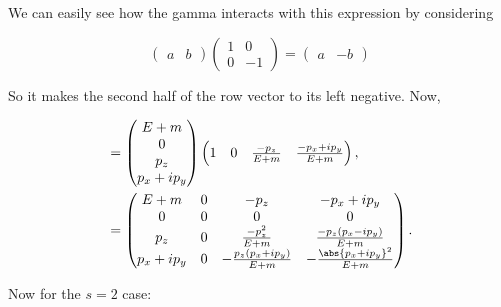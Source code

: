 We can easily see how the gamma interacts with this expression by considering

\begin{equation*}
    \begin{pmatrix}a & b\end{pmatrix}\begin{pmatrix}1 & 0 \\ 0 & -1\end{pmatrix} = \begin{pmatrix}a & -b\end{pmatrix}
\end{equation*}

So it makes the second half of the row vector to its left negative. Now,


\begin{align*}
    &= \begin{pmatrix}E+m \\ 0 \\ p_z \\ p_x + ip_y\end{pmatrix}\begin{pmatrix}1 & 0 & \frac{-p_z}{E+m} & \frac{-p_x + ip_y}{E+m}\end{pmatrix}, \\
    &= \begin{pmatrix}E+m & 0 & -p_z & -p_x+ip_y \\ 0 & 0 & 0 & 0 \\ p_z & 0 & \frac{-p_z^2}{E+m} & \frac{-p_z(p_x - ip_y)}{E+m} \\ p_x+ip_y & 0 & -\frac{p_z(p_x+ip_y)}{E+m} & -\frac{\abs{p_x+ip_y}^2}{E+m}\end{pmatrix}.
\end{align*}

Now for the $s=2$ case:

